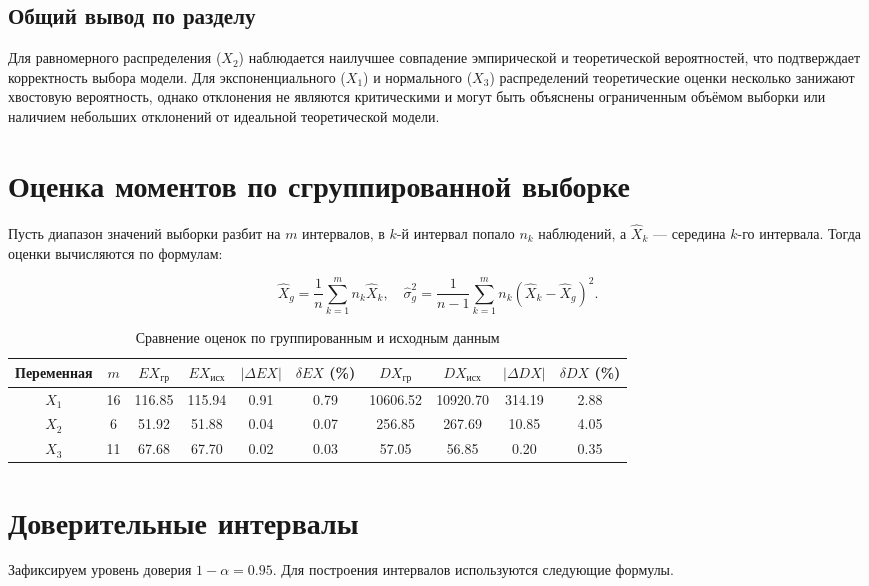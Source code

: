 \subsection{Общий вывод по разделу}

Для равномерного распределения ($X_2$) наблюдается наилучшее совпадение эмпирической и теоретической вероятностей, что подтверждает корректность выбора модели. Для экспоненциального ($X_1$) и нормального ($X_3$) распределений теоретические оценки несколько занижают хвостовую вероятность, однако отклонения не являются критическими и могут быть объяснены ограниченным объёмом выборки или наличием небольших отклонений от идеальной теоретической модели.

\section{Оценка моментов по сгруппированной выборке}

Пусть диапазон значений выборки разбит на $m$ интервалов, в $k$-й интервал попало $n_k$ наблюдений, а $\hat{X}_k$ — середина $k$-го интервала. Тогда оценки вычисляются по формулам:

$$
\hat{X}_g = \frac{1}{n} \sum_{k=1}^{m} n_k \hat{X}_k, \quad \hat{\sigma}^2_g = \frac{1}{n - 1} \sum_{k=1}^{m} n_k (\hat{X}_k - \hat{X}_g)^2.
$$

\begin{table}[h]
\centering
\caption{Сравнение оценок по группированным и исходным данным}
\begin{tabular}{cccccccccc}
\toprule
Переменная & $m$ & $EX_{\text{гр}}$ & $EX_{\text{исх}}$ & $|\Delta EX|$ & $\delta EX$ (\%) & $DX_{\text{гр}}$ & $DX_{\text{исх}}$ & $|\Delta DX|$ & $\delta DX$ (\%) \\
\midrule
$X_1$ & 16 & 116.85 & 115.94 & 0.91 & 0.79 & 10606.52 & 10920.70 & 314.19 & 2.88 \\
$X_2$ & 6  & 51.92  & 51.88  & 0.04 & 0.07 & 256.85   & 267.69   & 10.85  & 4.05 \\
$X_3$ & 11 & 67.68  & 67.70  & 0.02 & 0.03 & 57.05    & 56.85    & 0.20   & 0.35 \\
\bottomrule
\end{tabular}
\end{table}

\section{Доверительные интервалы}

Зафиксируем уровень доверия $1 - \alpha = 0.95$. Для построения интервалов используются следующие формулы.


